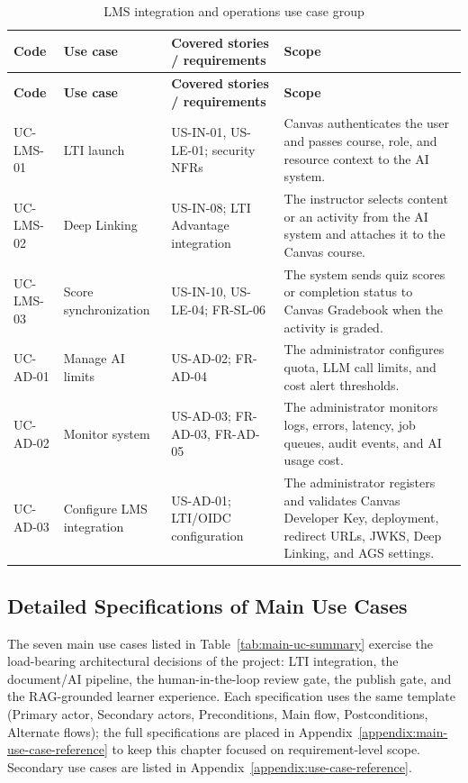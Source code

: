 \begingroup
\scriptsize
\setlength{\tabcolsep}{3pt}
\begin{longtable}{|p{1.8cm}|p{3.4cm}|p{4.0cm}|p{5.2cm}|}
\caption{LMS integration and operations use case group}
\label{tab:use-case-lms-van-hanh}\\
\hline
\textbf{Code} & \textbf{Use case} & \textbf{Covered stories / requirements} & \textbf{Scope} \\
\hline
\endfirsthead
\hline
\textbf{Code} & \textbf{Use case} & \textbf{Covered stories / requirements} & \textbf{Scope} \\
\hline
\endhead
UC-LMS-01 & LTI launch & US-IN-01, US-LE-01; security NFRs & Canvas authenticates the user and passes course, role, and resource context to the AI system. \\
\hline
UC-LMS-02 & Deep Linking & US-IN-08; LTI Advantage integration & The instructor selects content or an activity from the AI system and attaches it to the Canvas course. \\
\hline
UC-LMS-03 & Score synchronization & US-IN-10, US-LE-04; FR-SL-06 & The system sends quiz scores or completion status to Canvas Gradebook when the activity is graded. \\
\hline
UC-AD-01 & Manage AI limits & US-AD-02; FR-AD-04 & The administrator configures quota, LLM call limits, and cost alert thresholds. \\
\hline
UC-AD-02 & Monitor system & US-AD-03; FR-AD-03, FR-AD-05 & The administrator monitors logs, errors, latency, job queues, audit events, and AI usage cost. \\
\hline
UC-AD-03 & Configure LMS integration & US-AD-01; LTI/OIDC configuration & The administrator registers and validates Canvas Developer Key, deployment, redirect URLs, JWKS, Deep Linking, and AGS settings. \\
\hline
\end{longtable}
\endgroup

\subsection{Detailed Specifications of Main Use Cases}
\label{subsec:main-use-case-specs}

The seven main use cases listed in Table~\ref{tab:main-uc-summary}
exercise the load-bearing architectural decisions of the project: LTI
integration, the document/AI pipeline, the human-in-the-loop review
gate, the publish gate, and the RAG-grounded learner experience. Each
specification uses the same template (Primary actor, Secondary actors,
Preconditions, Main flow, Postconditions, Alternate flows); the full
specifications are placed in
Appendix~\ref{appendix:main-use-case-reference} to keep this chapter
focused on requirement-level scope. Secondary use cases are listed in
Appendix~\ref{appendix:use-case-reference}.

